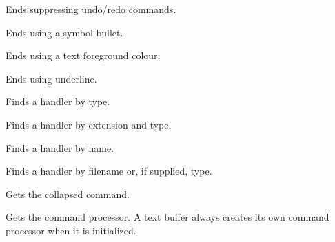 Ends suppressing undo/redo commands.

\label{wxrichtextbufferendsymbolbullet}


Ends using a symbol bullet.

\label{wxrichtextbufferendtextcolour}


Ends using a text foreground colour.

\label{wxrichtextbufferendunderline}


Ends using underline.

\label{wxrichtextbufferfindhandler}


Finds a handler by type.


Finds a handler by extension and type.


Finds a handler by name.

\label{wxrichtextbufferfindhandlerfilenameortype}


Finds a handler by filename or, if supplied, type.

\label{wxrichtextbuffergetbatchedcommand}


Gets the collapsed command.

\label{wxrichtextbuffergetcommandprocessor}


Gets the command processor. A text buffer always creates its own command processor when it is
initialized.

